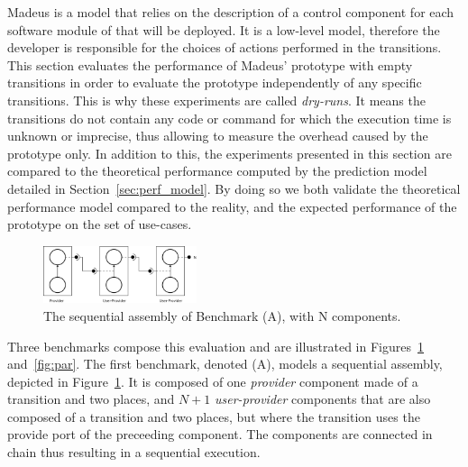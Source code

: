
Madeus is a model that relies on the description of a control
component for each software module of that will be deployed. It is a
low-level model, therefore the developer is responsible for the
choices of actions performed in the transitions.  This section
evaluates the performance of Madeus' prototype with empty transitions
in order to evaluate the \mad prototype independently of any specific
transitions. This is why these experiments are called
\emph{dry-runs}. It means the transitions do not contain any code or
command for which the execution time is unknown or imprecise, thus
allowing to measure the overhead caused by the prototype only. In
addition to this, the experiments presented in this section are
compared to the theoretical performance computed by the prediction
model detailed in Section~\ref{sec:perf_model}. By doing so we both
validate the theoretical performance model compared to the reality,
and the expected performance of the prototype on the set of use-cases.


\begin{figure}[h]
  \begin{center}
    \includegraphics[width=0.4\textwidth]{./images/seq.pdf}
    \caption{The \mad sequential assembly of Benchmark (A), with N components.}
    \label{fig:seq}
  \end{center}
\end{figure}

Three benchmarks compose this evaluation and are illustrated in
Figures~\ref{fig:seq} and~\ref{fig:par}.
The first benchmark, denoted (A), models a sequential \mad assembly,
depicted in Figure~\ref{fig:seq}. It is composed of one
\emph{provider} component made of a transition and two places, and
$N+1$ \emph{user-provider} components that are also composed of a
transition and two places, but where the transition uses the provide
port of the preceeding component. The components are connected in
chain thus resulting in a sequential execution.

